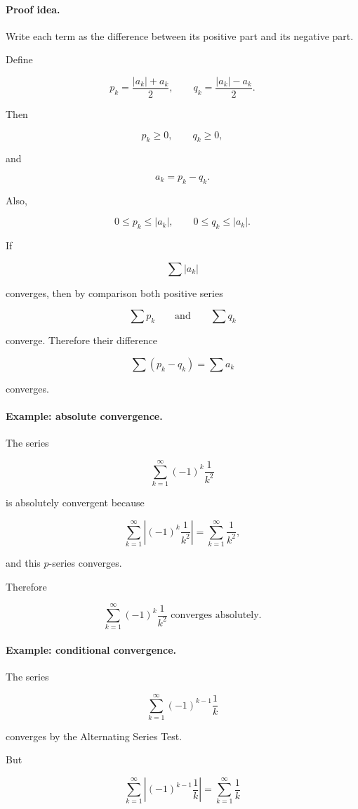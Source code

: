 \paragraph{Proof idea.}
Write each term as the difference between its positive part and its negative part.

Define

\[
p_k=\frac{|a_k|+a_k}{2},
\qquad
q_k=\frac{|a_k|-a_k}{2}.
\]

Then

\[
p_k\ge0,
\qquad
q_k\ge0,
\]

and

\[
a_k=p_k-q_k.
\]

Also,

\[
0\le p_k\le |a_k|,
\qquad
0\le q_k\le |a_k|.
\]

If

\[
\sum |a_k|
\]

converges, then by comparison both positive series

\[
\sum p_k
\qquad\text{and}\qquad
\sum q_k
\]

converge.  Therefore their difference

\[
\sum (p_k-q_k)=\sum a_k
\]

converges.

\paragraph{Example: absolute convergence.}
The series

\[
\sum_{k=1}^{\infty}(-1)^k\frac1{k^2}
\]

is absolutely convergent because

\[
\sum_{k=1}^{\infty}\left|(-1)^k\frac1{k^2}\right|
=
\sum_{k=1}^{\infty}\frac1{k^2},
\]

and this \(p\)-series converges.

Therefore

\[
\boxed{
\sum_{k=1}^{\infty}(-1)^k\frac1{k^2}
\text{ converges absolutely.}
}
\]

\paragraph{Example: conditional convergence.}
The series

\[
\sum_{k=1}^{\infty}(-1)^{k-1}\frac1k
\]

converges by the Alternating Series Test.

But

\[
\sum_{k=1}^{\infty}\left|(-1)^{k-1}\frac1k\right|
=
\sum_{k=1}^{\infty}\frac1k
\]

